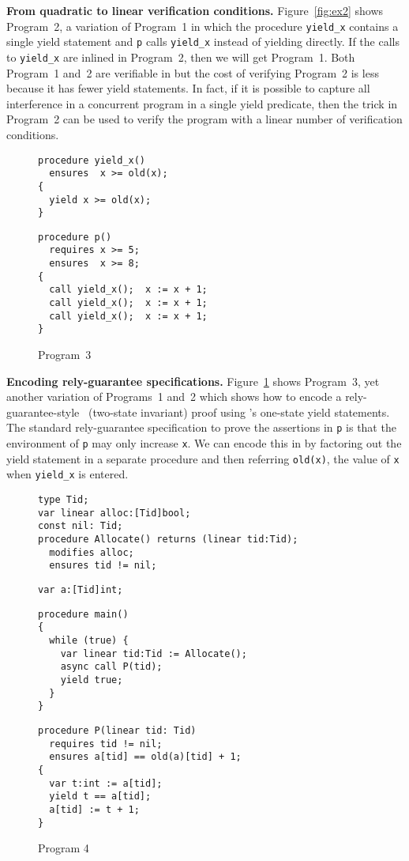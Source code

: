 {\bf From quadratic to linear verification conditions.}
Figure~\ref{fig:ex2} shows Program~2, a variation of Program~1 in which the procedure {\tt yield\_x} 
contains a single yield statement and {\tt p} calls {\tt yield\_x} instead of yielding directly.
If the calls to {\tt yield\_x} are inlined in Program~2, then we will get Program~1.
Both Program~1 and~2 are verifiable in \civl but the cost of verifying Program~2 is less because it has fewer yield statements.
In fact, if it is possible to capture all interference in a concurrent program in a single yield predicate, 
then the trick in Program~2 can be used to verify the program with a linear number of verification conditions.

\begin{figure}
\begin{verbatim}
procedure yield_x()
  ensures  x >= old(x);
{
  yield x >= old(x);
}
\end{verbatim}
\begin{verbatim}
procedure p()
  requires x >= 5;
  ensures  x >= 8;
{
  call yield_x();  x := x + 1;
  call yield_x();  x := x + 1;
  call yield_x();  x := x + 1;
}
\end{verbatim}
\caption{Program~3}
\label{fig:ex3}
\end{figure}

{\bf Encoding rely-guarantee specifications.}
Figure~\ref{fig:ex3} shows Program~3, yet another variation of Programs~1 and~2 which shows how to encode a rely-guarantee-style~\cite{Jones83} (two-state invariant)
proof using \civl's one-state yield statements. 
The standard rely-guarantee specification to prove the assertions in {\tt p} is that the environment of {\tt p} 
may only increase {\tt x}.
We can encode this in \civl by factoring out the yield statement in a separate procedure
and then referring {\tt old(x)}, the value of {\tt x} when {\tt yield\_x} is
entered. 


\begin{figure}
\begin{verbatim}
type Tid;
var linear alloc:[Tid]bool;
const nil: Tid;
procedure Allocate() returns (linear tid:Tid);
  modifies alloc;
  ensures tid != nil;
\end{verbatim}
\begin{verbatim}
var a:[Tid]int;
\end{verbatim}
\begin{verbatim}
procedure main()
{
  while (true) {
    var linear tid:Tid := Allocate();
    async call P(tid);
    yield true;
  }
}
\end{verbatim}
\begin{verbatim}
procedure P(linear tid: Tid)
  requires tid != nil;
  ensures a[tid] == old(a)[tid] + 1;
{
  var t:int := a[tid];
  yield t == a[tid];
  a[tid] := t + 1;
}
\end{verbatim}
\caption{Program 4}
\label{fig:ex5}
\end{figure}

